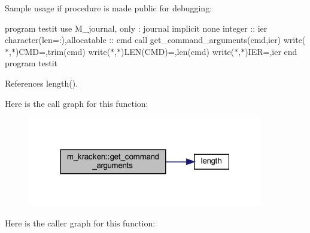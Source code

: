 Sample usage if procedure is made public for debugging\+:

program testit use M\+\_\+journal, only \+: journal implicit none integer \+:\+: ier character(len=\+:),allocatable \+:\+: cmd call get\+\_\+command\+\_\+arguments(cmd,ier) write($\ast$,$\ast$)\textquotesingle{}C\+MD=\textquotesingle{},trim(cmd) write($\ast$,$\ast$)\textquotesingle{}L\+E\+N(\+C\+M\+D)=\textquotesingle{},len(cmd) write($\ast$,$\ast$)\textquotesingle{}I\+ER=\textquotesingle{},ier end program testit 

References length().

Here is the call graph for this function\+:
\nopagebreak
\begin{figure}[H]
\begin{center}
\leavevmode
\includegraphics[width=291pt]{namespacem__kracken_a4c509f8594be3b73928c43c961c1caf4_cgraph}
\end{center}
\end{figure}
Here is the caller graph for this function\+:
\nopagebreak
